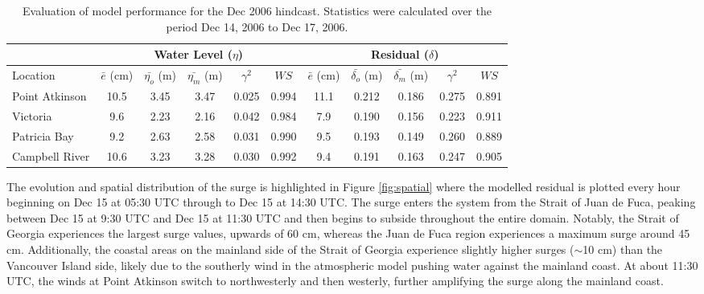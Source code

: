 \documentclass[pdftex,10pt]{article}
\begin{document}
\begin{table}[h]
\centering 
\begin{tabular}{|l |c c c c c | c c c c c|} 
\hline 
& \multicolumn{5}{|c|}{Water Level ($\eta$)}        & \multicolumn{5}{|c|}{Residual ($\delta$)} \\ 
\hline 
Location       & $\bar{e}$ (cm) & $\bar{\eta_{o}}$ (m) & $\bar{\eta_{m}}$ (m) & $\gamma^2$ & $WS$   & $\bar{e}$ (cm) & $\bar{\delta_{o}}$ (m) & $\bar{\delta_{m}}$ (m) & $\gamma^2$ & $WS$ \\
\hline 
Point Atkinson & 10.5           &  3.45                & 3.47                 &   0.025    & 0.994  & 11.1           &  0.212                 & 0.186                  &  0.275     & 0.891 \\
Victoria       &  9.6           &  2.23                & 2.16                 &   0.042    & 0.984  &  7.9           &  0.190                 & 0.156                  &  0.223     & 0.911 \\
Patricia Bay   &  9.2           &  2.63                & 2.58                 &   0.031    & 0.990  &  9.5           &  0.193                 & 0.149                  &  0.260     & 0.889 \\
Campbell River & 10.6           &  3.23                & 3.28                 &   0.030    & 0.992  &  9.4           &  0.191                 & 0.163                  &  0.247     & 0.905 \\
\hline 
\end{tabular}
\caption{Evaluation of model performance for the Dec 2006 hindcast. Statistics were calculated over the period Dec 14, 2006 to Dec 17, 2006.}
\label{tab:dec2006stat} 
\end{table}

The evolution and spatial distribution of the surge is highlighted in Figure \ref{fig:spatial} where the modelled residual is plotted every hour beginning on Dec 15 at 05:30 UTC through to Dec 15 at 14:30 UTC. The surge enters the system from the Strait of Juan de Fuca, peaking between Dec 15 at 9:30 UTC and Dec 15 at 11:30 UTC and then begins to subside throughout the entire domain. Notably, the Strait of Georgia experiences the largest surge values, upwards of 60 cm, whereas the Juan de Fuca region experiences a maximum surge around 45 cm. Additionally, the coastal areas on the mainland side of the Strait of Georgia experience slightly higher surges ($\sim$10 cm) than the Vancouver Island side, likely due to the southerly wind in the atmospheric model pushing water against the mainland coast. At about 11:30 UTC, the winds at Point Atkinson switch to northwesterly and then westerly, further amplifying the surge along the mainland coast. 
\end{document}
